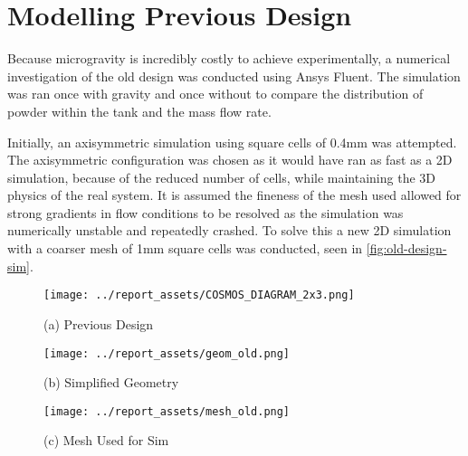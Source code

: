 \section{Modelling Previous Design}\label{sec:old-design-method}
Because microgravity is incredibly costly to achieve experimentally, a numerical investigation of the old design was conducted using Ansys Fluent. The simulation was ran once with gravity and once without to compare the distribution of powder within the tank and the mass flow rate. 

Initially, an axisymmetric simulation using square cells of 0.4mm was attempted. The axisymmetric configuration was chosen as it would have ran as fast as a 2D simulation, because of the reduced number of cells, while maintaining the 3D physics of the real system. It is assumed the fineness of the mesh used allowed for strong gradients in flow conditions to be resolved as the simulation was numerically unstable and repeatedly crashed. To solve this a new 2D simulation with a coarser mesh of 1mm square cells was conducted, seen in \autoref{fig:old-design-sim}.
\begin{figure}[htbp]
    \centering

    \begin{minipage}{0.3\textwidth}
        \centering
        \texttt{[image: ../report\_assets/COSMOS\_DIAGRAM\_2x3.png]}
        \caption*{(a) Previous Design}
    \end{minipage}
    \hfill
    \begin{minipage}{0.3\textwidth}
        \centering
        \texttt{[image: ../report\_assets/geom\_old.png]}
        \caption*{(b) Simplified Geometry}\label{fig:idkyet9}
    \end{minipage}
    \hfill
    \begin{minipage}{0.3\textwidth}
        \centering
        \texttt{[image: ../report\_assets/mesh\_old.png]}
        \caption*{(c) Mesh Used for Sim}\label{fig:idkyet10}
    \end{minipage}
    
\end{figure}\label{fig:old-design-sim}

